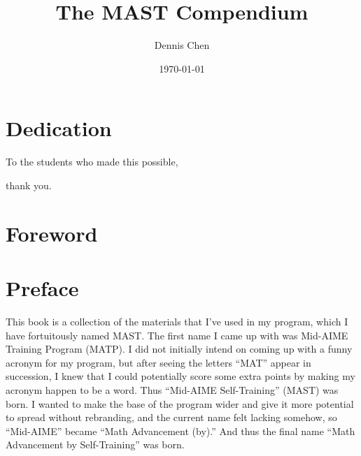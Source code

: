 \documentclass[blue,onecol]{shooting}
\title{The MAST Compendium}
\author{Dennis Chen}
\date{\today}
\begin{document}
\maketitle

\section*{Dedication}
\begin{center}
{\alegreyafont To the students who made this possible,

\alegreyafont thank you.}
\end{center}

\pagebreak

\section*{Foreword}

\pagebreak

\section*{Preface}
This book is a collection of the materials that I've used in my program, which I have fortuitously named MAST. The first name I came up with was Mid-AIME Training Program (MATP). I did not initially intend on coming up with a funny acronym for my program, but after seeing the letters ``MAT'' appear in succession, I knew that I could potentially score some extra points by making my acronym happen to be a word. Thus ``Mid-AIME Self-Training'' (MAST) was born. I wanted to make the base of the program wider and give it more potential to spread without rebranding, and the current name felt lacking somehow, so ``Mid-AIME'' became ``Math Advancement (by).'' And thus the final name ``Math Advancement by Self-Training'' was born.
\end{document}
